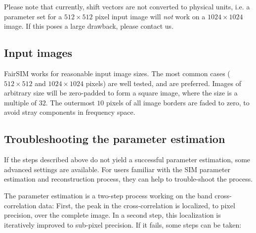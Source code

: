 \documentclass[twoside=false,
           twocolumn=false,
           a4paper,DIV=15,
           10pt]{scrartcl}
\begin{document}
Please note that currently, shift vectors are not converted
to physical units, i.e. a parameter set for a $512\times 512$
pixel input image will \emph{not} work on a $1024\times1024$
image. If this poses a large drawback, please contact us.

\subsection{Input images}

FairSIM works for reasonable input image sizes. The
most common cases ($512\times512$ and $1024\times1024$ pixels)
are well tested, and are preferred.  Images of arbitrary size 
will be zero-padded to form a square image, 
where the size is a multiple of $32$. The outermost $10$
pixels of all image borders are faded to zero, to avoid
stray components in frequency space.

\subsection{Troubleshooting the parameter estimation}

If the steps described above do not yield a successful parameter estimation,
some advanced settings are available. For users familiar with the
SIM parameter estimation and reconstruction process, they can help
to trouble-shoot the process. 

The parameter estimation is a two-step process working on the
band cross-correlation data: First, the peak in the cross-correlation
is localized, to pixel precision, over the complete image. In a
second step, this localization is iteratively improved to sub-pixel
precision. If it fails, some steps can be taken:
\end{document}
